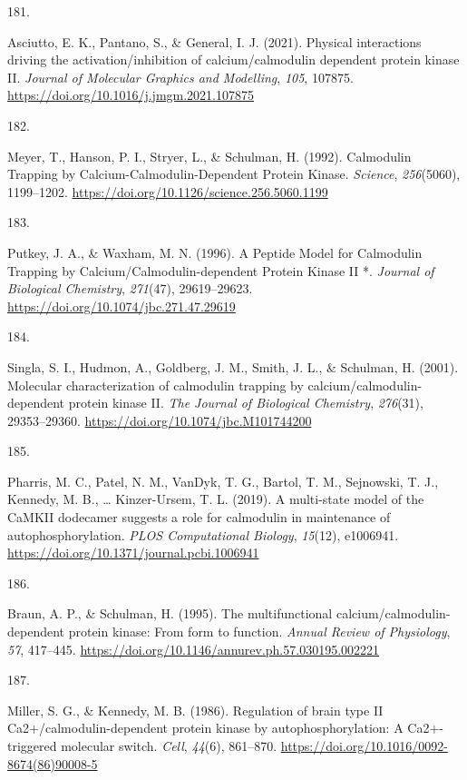 \documentclass[
  11pt,
  letterpaper,
]{scrreprt}
\newlength{\cslhangindent}
\newlength{\csllabelwidth}
\newenvironment{CSLReferences}[2] %
 {\begin{list}{}{%
  \setlength{\itemindent}{0pt}
  \setlength{\leftmargin}{0pt}
  \setlength{\parsep}{0pt}
  \ifodd #1
   \setlength{\leftmargin}{\cslhangindent}
   \setlength{\itemindent}{-1\cslhangindent}
  \fi
  \setlength{\itemsep}{#2\baselineskip}}}
 {\end{list}}
\newcommand{\CSLLeftMargin}[1]{\parbox[t]{\csllabelwidth}{\strut#1\strut}}
\newcommand{\CSLRightInline}[1]{\parbox[t]{\linewidth - \csllabelwidth}{\strut#1\strut}}
\begin{document}
\begin{CSLReferences}{0}{0}
\CSLLeftMargin{181. }%
\CSLRightInline{Asciutto, E. K., Pantano, S., \& General, I. J. (2021).
Physical interactions driving the activation/inhibition of
calcium/calmodulin dependent protein kinase {II}. \emph{Journal of
Molecular Graphics and Modelling}, \emph{105}, 107875.
\url{https://doi.org/10.1016/j.jmgm.2021.107875}}

\CSLLeftMargin{182. }%
\CSLRightInline{Meyer, T., Hanson, P. I., Stryer, L., \& Schulman, H.
(1992). Calmodulin {Trapping} by {Calcium-Calmodulin-Dependent Protein
Kinase}. \emph{Science}, \emph{256}(5060), 1199--1202.
\url{https://doi.org/10.1126/science.256.5060.1199}}

\CSLLeftMargin{183. }%
\CSLRightInline{Putkey, J. A., \& Waxham, M. N. (1996). A {Peptide
Model} for {Calmodulin Trapping} by {Calcium}/{Calmodulin-dependent
Protein Kinase II} *. \emph{Journal of Biological Chemistry},
\emph{271}(47), 29619--29623.
\url{https://doi.org/10.1074/jbc.271.47.29619}}

\CSLLeftMargin{184. }%
\CSLRightInline{Singla, S. I., Hudmon, A., Goldberg, J. M., Smith, J.
L., \& Schulman, H. (2001). Molecular characterization of calmodulin
trapping by calcium/calmodulin-dependent protein kinase {II}. \emph{The
Journal of Biological Chemistry}, \emph{276}(31), 29353--29360.
\url{https://doi.org/10.1074/jbc.M101744200}}

\CSLLeftMargin{185. }%
\CSLRightInline{Pharris, M. C., Patel, N. M., VanDyk, T. G., Bartol, T.
M., Sejnowski, T. J., Kennedy, M. B., \ldots{} Kinzer-Ursem, T. L.
(2019). A multi-state model of the {CaMKII} dodecamer suggests a role
for calmodulin in maintenance of autophosphorylation. \emph{PLOS
Computational Biology}, \emph{15}(12), e1006941.
\url{https://doi.org/10.1371/journal.pcbi.1006941}}

\CSLLeftMargin{186. }%
\CSLRightInline{Braun, A. P., \& Schulman, H. (1995). The
multifunctional calcium/calmodulin-dependent protein kinase: From form
to function. \emph{Annual Review of Physiology}, \emph{57}, 417--445.
\url{https://doi.org/10.1146/annurev.ph.57.030195.002221}}

\CSLLeftMargin{187. }%
\CSLRightInline{Miller, S. G., \& Kennedy, M. B. (1986). Regulation of
brain type {II Ca2}+/calmodulin-dependent protein kinase by
autophosphorylation: A {Ca2}+-triggered molecular switch. \emph{Cell},
\emph{44}(6), 861--870.
\url{https://doi.org/10.1016/0092-8674(86)90008-5}}


\end{CSLReferences}
\end{document}
